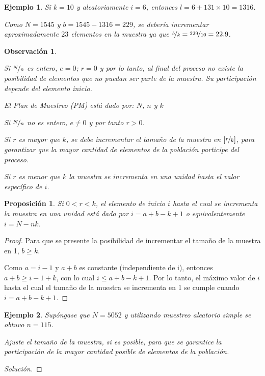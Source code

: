 \documentclass[a5paper,doc,10pt,noapacite]{apa6}
\newtheorem{proposicion}{Proposición}
\newtheorem{observ}{Observación}
\newtheorem{ejem}{Ejemplo}
\begin{document}
{{\begin{ejem}
	Si \(k=10\) y aleatoriamente \(i=6\), entonces \(l=6+131 \times 10=1316\).
	
	Como \(N=1545\) y \(b=1545-1316=229\), se debería incrementar  aproximadamente \(23\) elementos en la muestra ya que \(\nicefrac{b}{k}=\nicefrac{229}{10}=22.9\).
\end{ejem}

\begin{observ}\quad
	\begin{APAenumerate}
		\item Si \(\nicefrac{N}{n}\) es entero, \(e=0\); \(r=0\) y por lo tanto, al final del proceso no existe la posibilidad de elementos que no puedan ser parte de la muestra. Su participación depende del elemento inicio.
		
		El Plan de Muestreo (PM) está dado por: \(N\), \(n\) y \(k\)
		
		\item Si \(\nicefrac{N}{n}\) no es entero, \(e\neq 0\) y por tanto \(r>0\).
		
		Si \(r\) es mayor que \(k\), se debe incrementar el tamaño de la muestra en \(\left[\nicefrac{r}{k}\right]\), para garantizar que la mayor cantidad de elementos de la población participe del proceso.
		
		Si \(r\) es menor que \(k\) la muestra se incrementa en una unidad hasta el valor específico de \(i\).	
	\end{APAenumerate}
\end{observ}

\begin{proposicion}\label{prop-6.2}
	Si \(0<r<k\), el elemento de inicio \(i\) hasta el cual se incrementa la muestra en una unidad está dado por \(i=a+b-k+1\) o equivalentemente \(i=N-nk\).
\end{proposicion}
\begin{proof}
	Para que se presente la posibilidad de incrementar el tamaño de la muestra en 1, \(b\geq k\). 
	
	Como \(a=i-1\) y \(a+b\) es constante (independiente de i), entonces \(a+b\geq i-1+k\), con lo cual \(i\leq a+b-k+1\). Por lo tanto, el máximo valor de \(i\) hasta el cual el tamaño de la muestra se incrementa en 1 se cumple cuando \(i=a+b-k+1\).
\end{proof}

\begin{ejem}\label{ejem-6.2}
	Supóngase que \(N=5052\) y utilizando muestreo aleatorio simple se obtuvo \(n=115\).
	
	
	Ajuste el tamaño de la muestra, si es posible, para que se garantice la participación de la mayor cantidad posible de elementos de la población.
\end{ejem}
\begin{proof}[Solución]\quad


\end{proof}}}
\end{document}
